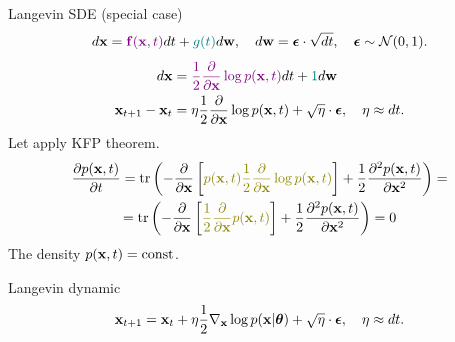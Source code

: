 \begin{frame}{Langevin SDE (special case)}
	\vspace{-0.4cm}
	\[
		d\mathbf{x} = {\color{violet}\mathbf{f}(\mathbf{x}, t)} dt + {\color{teal}g(t)} d \mathbf{w}, \quad d \mathbf{w} = \boldsymbol{\epsilon} \cdot \sqrt{dt}, \quad \boldsymbol{\epsilon} \sim \mathcal{N}(0, 1).
	\]
	\vspace{-0.4cm}
	\begin{align*}
		d \mathbf{x} &= {\color{violet}\frac{1}{2} \frac{\partial}{\partial \mathbf{x}} \log p(\mathbf{x}, t)} d t + {\color{teal} 1 }d \mathbf{w} \\
		\mathbf{x}_{t + 1} - \mathbf{x}_t &= \eta \frac{1}{2} \frac{\partial}{\partial \mathbf{x}} \log p(\mathbf{x}, t) + \sqrt{\eta} \cdot \boldsymbol{\epsilon}, \quad \eta \approx dt.
	\end{align*}
	Let apply KFP theorem.
	\begin{multline*}
		\frac{\partial p(\bx, t)}{\partial t} =  \text{tr} \left(- \frac{\partial}{\partial \bx}\left[ {\color{olive}p(\bx, t) \frac{1}{2} \frac{\partial}{\partial \bx} \log p(\bx, t)} \right]  + \frac{1}{2} \frac{\partial^2 p(\bx, t)}{\partial \bx^2} \right) = \\
		= \text{tr} \left(- \frac{\partial}{\partial \bx}\left[ {\color{olive}\frac{1}{2} \frac{\partial}{\partial \bx} p(\bx, t) } \right]  + \frac{1}{2} \frac{\partial^2 p(\bx, t)}{\partial \bx^2} \right) = 0
	\end{multline*}
	The density $p(\mathbf{x}, t) = \text{const}$.
	\begin{block}{Langevin dynamic}
		\vspace{-0.3cm}
		\[
			\mathbf{x}_{t + 1} = \mathbf{x}_t + \eta \frac{1}{2} \nabla_{\mathbf{x}} \log p(\mathbf{x} | \boldsymbol{\theta}) + \sqrt{\eta} \cdot \boldsymbol{\epsilon}, \quad \eta \approx dt.
		\]
		\vspace{-0.3cm}
	\end{block}
\end{frame}
